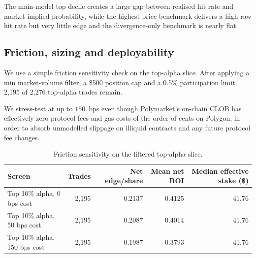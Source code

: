 \documentclass[11pt,a4paper]{article}
\newcommand{\edit}[1]{#1}
\begin{document}
The main-model top decile creates a large gap between realised hit rate and market-implied probability, while the highest-price benchmark delivers a high raw hit rate but very little edge and the divergence-only benchmark is nearly flat.

\vspace{-0.75em}
\subsection{Friction, sizing and deployability}

\edit{We use a simple friction sensitivity check on the top-alpha slice. After applying a min market-volume filter, a \$500 position cap and a 0.5\% participation limit, 2,195 of 2,276 top-alpha trades remain.}

We stress-test at up to $150$~bps even though Polymarket's on-chain
CLOB has effectively zero protocol fees and gas costs of the order of
cents on Polygon, in order to absorb unmodelled slippage on illiquid
contracts and any future protocol fee changes.

\begin{table}[H]
\centering
\small
\begin{tabular}{lrrrr}
\toprule
Screen & Trades & Net edge/share & Mean net ROI & Median effective stake (\$) \\
\midrule
\edit{Top 10\% alpha, 0 bps cost}   & \edit{2,195} & \edit{0.2137} & \edit{0.4125} & \edit{41.76} \\
\edit{Top 10\% alpha, 50 bps cost}  & \edit{2,195} & \edit{0.2087} & \edit{0.4014} & \edit{41.76} \\
\edit{Top 10\% alpha, 150 bps cost} & \edit{2,195} & \edit{0.1987} & \edit{0.3793} & \edit{41.76} \\
\bottomrule
\end{tabular}
\caption{Friction sensitivity on the filtered top-alpha slice.}
\label{tab:friction}
\end{table}
\end{document}

